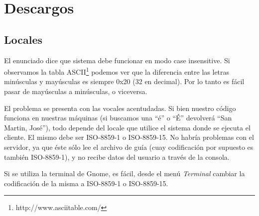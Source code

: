 \section{Descargos}

\subsection{Locales}
El enunciado dice que sistema debe funcionar en modo case insensitive. Si
observamos la tabla ASCII\footnote{http://www.asciitable.com/} podemos ver que
la diferencia entre las letras minúsculas y mayúsculas es siempre 0x20 (32 en
decimal). Por lo tanto es fácil pasar de mayúsculas a minúsculas, o viceversa.

El problema se presenta con las vocales acentudadas. Si bien nuestro código
funciona en nuestras máquinas (si buscamos una ``é'' o ``É'' devolverá ``San
Martin, José''), todo depende del locale que utilice el sistema donde se
ejecuta el cliente. El mismo debe ser ISO-8859-1 o ISO-8859-15. No habría
problemas con el servidor, ya que éste sólo lee el archivo de guía (cuay
codificación por supuesto es también ISO-8859-1), y no recibe datos del usuario
a través de la consola.

Si se utiliza la terminal de Gnome, es fácil, desde el menú \emph{Terminal}
cambiar la codificación de la misma a ISO-8859-1 o ISO-8859-15.

